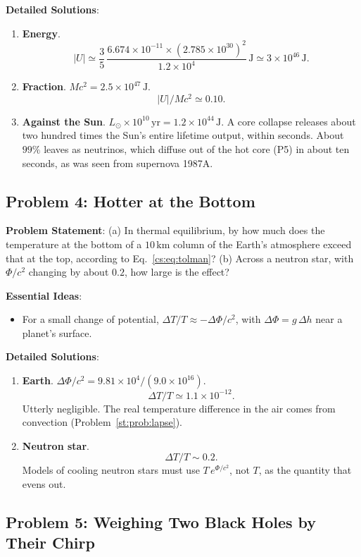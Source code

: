 \textbf{Detailed Solutions}:
\begin{enumerate}[label=(\alph*)]
	\item \textbf{Energy}.
	\[
	\boxed{|U|\simeq\frac35\,\frac{6.674\times10^{-11}\times(2.785\times10^{30})^2}{1.2\times10^4}\,\mathrm J\simeq3\times10^{46}\,\mathrm J.}
	\]
	\item \textbf{Fraction}. $Mc^2=2.5\times10^{47}\,\mathrm J$.
	\[
	\boxed{|U|/Mc^2\simeq0.10.}
	\]
	\item \textbf{Against the Sun}. $L_\odot\times10^{10}\,\mathrm{yr}=1.2\times10^{44}\,\mathrm J$. A core collapse releases about two hundred times the Sun's entire lifetime output, within seconds. About $99\%$ leaves as neutrinos, which diffuse out of the hot core (P5) in about ten seconds, as was seen from supernova 1987A.
\end{enumerate}

\subsection{Problem 4: Hotter at the Bottom}
\label{cs:prob:tolman}

\textbf{Problem Statement}: (a) In thermal equilibrium, by how much does the temperature at the bottom of a $10\,\mathrm{km}$ column of the Earth's atmosphere exceed that at the top, according to Eq.~\eqref{cs:eq:tolman}? (b) Across a neutron star, with $\Phi/c^2$ changing by about $0.2$, how large is the effect?

\textbf{Essential Ideas}:
\begin{itemize}
	\item For a small change of potential, $\Delta T/T\approx-\Delta\Phi/c^2$, with $\Delta\Phi=g\,\Delta h$ near a planet's surface.
\end{itemize}

\textbf{Detailed Solutions}:
\begin{enumerate}[label=(\alph*)]
	\item \textbf{Earth}. $\Delta\Phi/c^2=9.81\times10^4/(9.0\times10^{16})$.
	\[
	\boxed{\Delta T/T\simeq1.1\times10^{-12}.}
	\]
	Utterly negligible. The real temperature difference in the air comes from convection (Problem~\ref{st:prob:lapse}).
	\item \textbf{Neutron star}.
	\[
	\boxed{\Delta T/T\sim0.2.}
	\]
	Models of cooling neutron stars must use $T\,e^{\Phi/c^2}$, not $T$, as the quantity that evens out.
\end{enumerate}

\subsection{Problem 5: Weighing Two Black Holes by Their Chirp}
\label{cs:prob:chirp}


